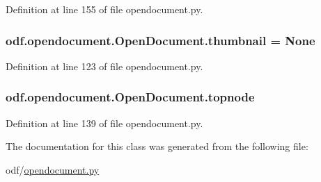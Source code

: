 Definition at line 155 of file opendocument.\+py.

\hypertarget{classodf_1_1opendocument_1_1OpenDocument_af58e727a473380d2157e0eca5d136738}{
\subsubsection[{thumbnail}]{\setlength{\rightskip}{0pt plus 5cm}odf.\+opendocument.\+Open\+Document.\+thumbnail = None\hspace{0.3cm}{\ttfamily [static]}}}\label{classodf_1_1opendocument_1_1OpenDocument_af58e727a473380d2157e0eca5d136738}


Definition at line 123 of file opendocument.\+py.

\hypertarget{classodf_1_1opendocument_1_1OpenDocument_a8bee919284edd7ff59982d04db3ae982}{
\subsubsection[{topnode}]{\setlength{\rightskip}{0pt plus 5cm}odf.\+opendocument.\+Open\+Document.\+topnode}}\label{classodf_1_1opendocument_1_1OpenDocument_a8bee919284edd7ff59982d04db3ae982}


Definition at line 139 of file opendocument.\+py.



The documentation for this class was generated from the following file\+:\begin{DoxyCompactItemize}
\item 
odf/\hyperlink{opendocument_8py}{opendocument.\+py}\end{DoxyCompactItemize}
